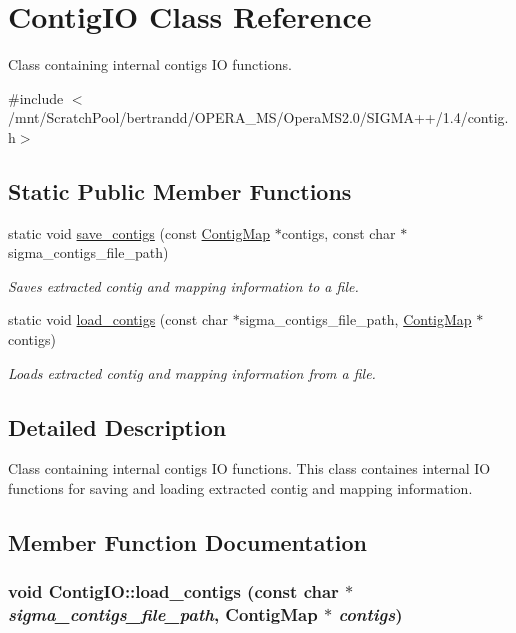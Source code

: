 \hypertarget{classContigIO}{
\section{ContigIO Class Reference}
\label{classContigIO}
}


Class containing internal contigs IO functions.  


{\ttfamily \#include $<$/mnt/ScratchPool/bertrandd/OPERA\_\-MS/OperaMS2.0/SIGMA++/1.4/contig.h$>$}\subsection*{Static Public Member Functions}
\begin{DoxyCompactItemize}
\item 
static void \hyperlink{classContigIO_acf14e24e110dc3284984e9fa00725678}{save\_\-contigs} (const \hyperlink{contig_8h_aa2acb8d3b78def617ec4509a1f684c4e}{ContigMap} $\ast$contigs, const char $\ast$sigma\_\-contigs\_\-file\_\-path)
\begin{DoxyCompactList}\small\item\em Saves extracted contig and mapping information to a file. \item\end{DoxyCompactList}\item 
static void \hyperlink{classContigIO_a5de305de72f812417c8d0c46764f63b0}{load\_\-contigs} (const char $\ast$sigma\_\-contigs\_\-file\_\-path, \hyperlink{contig_8h_aa2acb8d3b78def617ec4509a1f684c4e}{ContigMap} $\ast$contigs)
\begin{DoxyCompactList}\small\item\em Loads extracted contig and mapping information from a file. \item\end{DoxyCompactList}\end{DoxyCompactItemize}


\subsection{Detailed Description}
Class containing internal contigs IO functions. This class containes internal IO functions for saving and loading extracted contig and mapping information. 

\subsection{Member Function Documentation}
\hypertarget{classContigIO_a5de305de72f812417c8d0c46764f63b0}{
\subsubsection[{load\_\-contigs}]{\setlength{\rightskip}{0pt plus 5cm}void ContigIO::load\_\-contigs (const char $\ast$ {\em sigma\_\-contigs\_\-file\_\-path}, \/  {\bf ContigMap} $\ast$ {\em contigs})}}
\label{classContigIO_a5de305de72f812417c8d0c46764f63b0}


